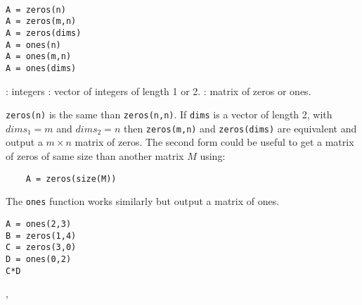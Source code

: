 \begin{mandesc}
  \\ 
\end{mandesc}
\begin{calling_sequence}
\begin{verbatim}
A = zeros(n)
A = zeros(m,n)
A = zeros(dims)
A = ones(n)
A = ones(m,n)
A = ones(dims)
\end{verbatim}
\end{calling_sequence}
\begin{parameters}
  \begin{varlist}
    : integers
    : vector of integers of length 1 or 2.
    : matrix of zeros or ones.
  \end{varlist}
\end{parameters}

\begin{mandescription}
\verb+zeros(n)+ is the same than \verb+zeros(n,n)+. If \verb+dims+ is a vector of length 2, 
with $dims_1 = m$ and $dims_2 = n$ then \verb+zeros(m,n)+ and  \verb+zeros(dims)+ are equivalent 
and output a $m \times n$ matrix of zeros. The second form could be useful to get a matrix of 
zeros of same size than another matrix $M$ using:
\begin{verbatim}
    A = zeros(size(M))
\end{verbatim}

The \verb+ones+ function works similarly but output a matrix of ones.

\end{mandescription}


\begin{examples}
\begin{Verbatim}
A = ones(2,3) 
B = zeros(1,4)
C = zeros(3,0)
D = ones(0,2)
C*D
\end{Verbatim} 

\end{examples}

\begin{manseealso}
, 
\end{manseealso}

